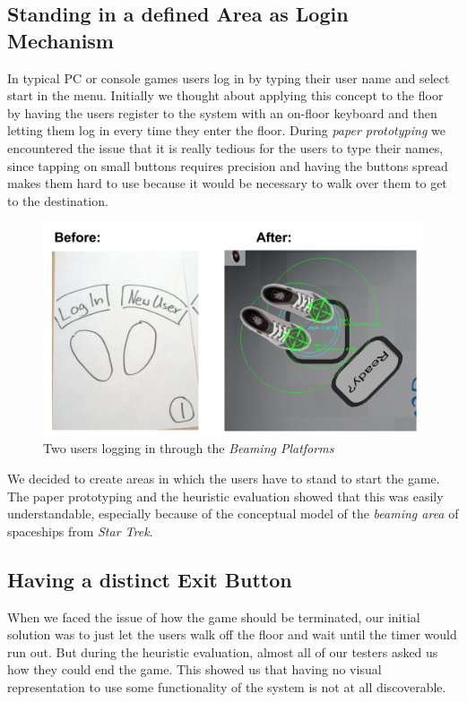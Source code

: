 \documentclass{sigchi}
\begin{document}
\pagebreak

\subsection{Standing in a defined Area as Login Mechanism}
\vspace{1mm}
In typical PC or console games users log in by typing their user name and select start in the menu. Initially we thought about applying this concept to the floor by having the users register to the system with an on-floor keyboard and then letting them log in every time they enter the floor. During \textit{paper prototyping} we encountered the issue that it is really tedious for the users to type their names, since tapping on small buttons requires precision and having the buttons spread makes them hard to use because it would be necessary to walk over them to get to the destination. 
\begin{figure}[H]
\centering
\includegraphics[width=0.99\columnwidth]{loginarea}
\caption{Two users logging in through the \textit{Beaming Platforms}}
\label{fig:beamingArea}
\end{figure}
We decided to create areas in which the users have to stand to start the game. The paper prototyping and the heuristic evaluation showed that this was easily understandable, especially because of the conceptual model of the \textit{beaming area} of spaceships from \textit{Star Trek}. 




\subsection{Having a distinct Exit Button}
\vspace{1mm}
When we faced the issue of how the game should be terminated, our initial solution was to just let the users walk off the floor and wait until the timer would run out. But during the heuristic evaluation, almost all of our testers asked us how they could end the game. This showed us that having no visual representation to use some functionality of the system is not at all discoverable. 
\end{document}
